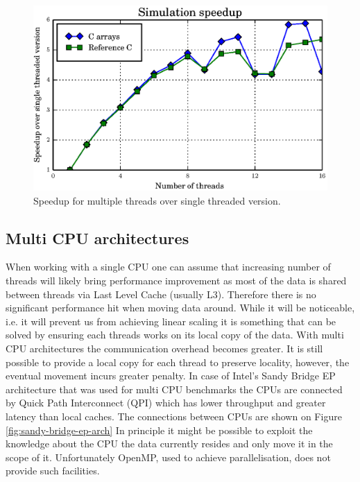 \documentclass[12pt, a4paper]{report}
\begin{document}
\begin{figure}[H]
  \begin{center}
    \includegraphics[width=\columnwidth]{graphs/speedup.eps}
    \caption{Speedup for multiple threads over single threaded version.}
    \label{fig:speedup}
  \end{center}
\end{figure}

\subsection{Multi CPU architectures}\label{subsec:mult-cpu-arch}
When working with a single CPU one can assume that increasing number of threads
will likely bring performance improvement as most of the data is shared between
threads via Last Level Cache (usually L3). Therefore there is no significant
performance hit when moving data around. While it will be noticeable, i.e.
it will prevent us from achieving linear scaling it is something that can
be solved by ensuring each threads works on its local copy of the data. With
multi CPU architectures the communication overhead becomes greater. It is still
possible to provide a local copy for each thread to preserve locality, however,
the eventual movement incurs greater penalty. In case of Intel's Sandy Bridge
EP architecture that was used for multi CPU benchmarks the CPUs are connected
by Quick Path Interconnect (QPI) which has lower throughput and greater latency
than local caches. The connections between CPUs are shown on Figure
\ref{fig:sandy-bridge-ep-arch} In principle it might be possible to exploit the
knowledge about the CPU the data currently resides and only move it in the
scope of it. Unfortunately OpenMP, used to achieve parallelisation, does not
provide such facilities.
\end{document}
